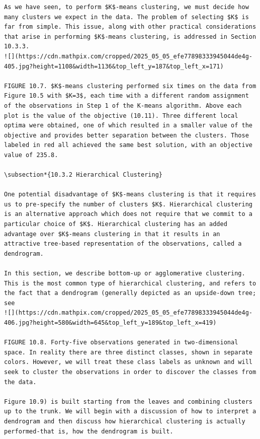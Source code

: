 \documentclass[10pt]{article}
\begin{document}
\begin{verbatim}
As we have seen, to perform $K$-means clustering, we must decide how many clusters we expect in the data. The problem of selecting $K$ is far from simple. This issue, along with other practical considerations that arise in performing $K$-means clustering, is addressed in Section 10.3.3.
![](https://cdn.mathpix.com/cropped/2025_05_05_efe77898333945044de4g-405.jpg?height=1108&width=1136&top_left_y=187&top_left_x=171)

FIGURE 10.7. $K$-means clustering performed six times on the data from Figure 10.5 with $K=3$, each time with a different random assignment of the observations in Step 1 of the K-means algorithm. Above each plot is the value of the objective (10.11). Three different local optima were obtained, one of which resulted in a smaller value of the objective and provides better separation between the clusters. Those labeled in red all achieved the same best solution, with an objective value of 235.8.

\subsection*{10.3.2 Hierarchical Clustering}

One potential disadvantage of $K$-means clustering is that it requires us to pre-specify the number of clusters $K$. Hierarchical clustering is an alternative approach which does not require that we commit to a particular choice of $K$. Hierarchical clustering has an added advantage over $K$-means clustering in that it results in an attractive tree-based representation of the observations, called a dendrogram.

In this section, we describe bottom-up or agglomerative clustering. This is the most common type of hierarchical clustering, and refers to the fact that a dendrogram (generally depicted as an upside-down tree; see
![](https://cdn.mathpix.com/cropped/2025_05_05_efe77898333945044de4g-406.jpg?height=580&width=645&top_left_y=189&top_left_x=419)

FIGURE 10.8. Forty-five observations generated in two-dimensional space. In reality there are three distinct classes, shown in separate colors. However, we will treat these class labels as unknown and will seek to cluster the observations in order to discover the classes from the data.

Figure 10.9) is built starting from the leaves and combining clusters up to the trunk. We will begin with a discussion of how to interpret a dendrogram and then discuss how hierarchical clustering is actually performed-that is, how the dendrogram is built.


\end{verbatim}
\end{document}
